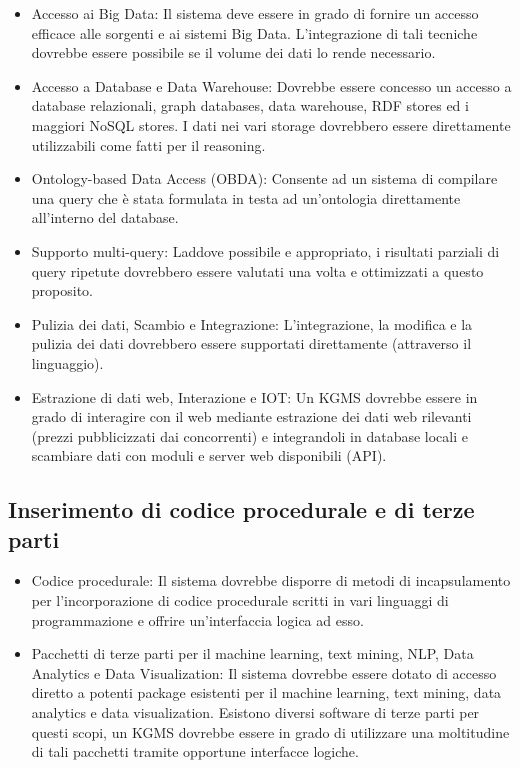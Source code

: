 \begin{itemize}
	\item Accesso ai Big Data: Il sistema deve essere in grado di fornire un accesso efficace alle sorgenti e ai sistemi Big Data. L'integrazione di tali tecniche dovrebbe essere possibile se il volume dei dati lo rende necessario.
	\item Accesso a Database e Data Warehouse: Dovrebbe essere concesso un accesso a database relazionali, graph databases, data warehouse, RDF stores ed i maggiori NoSQL stores. I dati nei vari storage dovrebbero essere direttamente utilizzabili come fatti per il reasoning.
	\item Ontology-based Data Access (OBDA): Consente ad un sistema di compilare una query che è stata formulata in testa ad un'ontologia direttamente all'interno del database.
	\item Supporto multi-query: Laddove possibile e appropriato, i risultati parziali di query ripetute dovrebbero essere valutati una volta e ottimizzati a questo proposito.
	\item Pulizia dei dati, Scambio e Integrazione: L'integrazione, la modifica e la pulizia dei dati dovrebbero essere supportati direttamente (attraverso il linguaggio).
	\item Estrazione di dati web, Interazione e IOT: Un KGMS dovrebbe essere in grado di interagire con il web mediante estrazione dei dati web rilevanti (prezzi pubblicizzati dai concorrenti) e integrandoli in database locali e scambiare dati con moduli e server web disponibili (API).
\end{itemize}

\subsection{Inserimento di codice procedurale e di terze parti}

\begin{itemize}
	\item Codice procedurale: Il sistema dovrebbe disporre di metodi di incapsulamento per l'incorporazione di codice procedurale scritti in vari linguaggi di programmazione e offrire un'interfaccia logica ad esso.
	\item Pacchetti di terze parti per il machine learning, text mining, NLP, Data Analytics e Data Visualization: Il sistema dovrebbe essere dotato di accesso diretto a potenti package esistenti per il machine learning, text mining, data analytics e data visualization. Esistono diversi software di terze parti per questi scopi, un KGMS dovrebbe essere in grado di utilizzare una moltitudine di tali pacchetti tramite opportune interfacce logiche.
\end{itemize}

